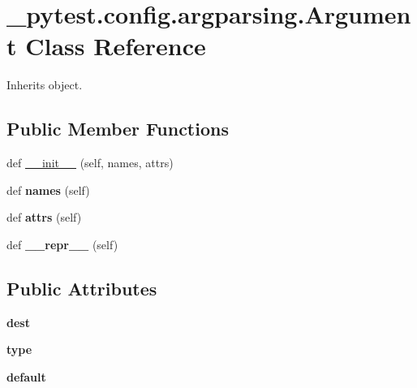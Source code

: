 \hypertarget{class__pytest_1_1config_1_1argparsing_1_1_argument}{}\section{\+\_\+pytest.\+config.\+argparsing.\+Argument Class Reference}
\label{class__pytest_1_1config_1_1argparsing_1_1_argument}


Inherits object.

\subsection*{Public Member Functions}
\begin{DoxyCompactItemize}
\item 
def \hyperlink{class__pytest_1_1config_1_1argparsing_1_1_argument_a89fae6a5de76be148efe81f8e36cc444}{\+\_\+\+\_\+init\+\_\+\+\_\+} (self, names, attrs)
\item 
\mbox{\label{class__pytest_1_1config_1_1argparsing_1_1_argument_ac8d6dbd38b77157e1bdde5f376d7c41f}} 
def {\bfseries names} (self)
\item 
\mbox{\label{class__pytest_1_1config_1_1argparsing_1_1_argument_a8ca51d4264f31d2b1ad470157d1e33bf}} 
def {\bfseries attrs} (self)
\item 
\mbox{\label{class__pytest_1_1config_1_1argparsing_1_1_argument_a26cd0286fc6cd2be53b75021f67108b6}} 
def {\bfseries \+\_\+\+\_\+repr\+\_\+\+\_\+} (self)
\end{DoxyCompactItemize}
\subsection*{Public Attributes}
\begin{DoxyCompactItemize}
\item 
\mbox{\label{class__pytest_1_1config_1_1argparsing_1_1_argument_ae5321c2f35995da1fa28a0d319140f48}} 
{\bfseries dest}
\item 
\mbox{\label{class__pytest_1_1config_1_1argparsing_1_1_argument_a49e614fd023a727577e7c5f8b8720a71}} 
{\bfseries type}
\item 
\mbox{\label{class__pytest_1_1config_1_1argparsing_1_1_argument_a1bf25b5927378cfd54bb604ff1e69feb}} 
{\bfseries default}
\end{DoxyCompactItemize}


